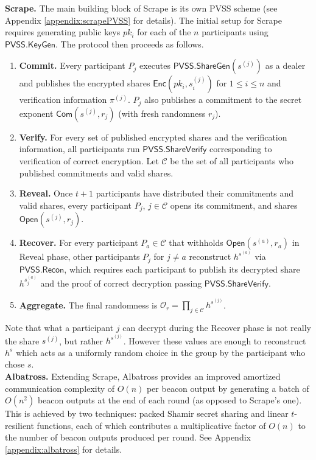 \documentclass[letterpaper,twocolumn,10pt]{article}
\theoremstyle{definition}
\theoremstyle{remark}
\begin{document}
\noindent\textbf{Scrape.} The main building block of Scrape is its own PVSS scheme (see Appendix \ref{appendix:scrapePVSS} for details). The initial setup for Scrape requires generating public keys $pk_i$ for each of the $n$ participants using $\mathsf{PVSS.KeyGen}$. The protocol then proceeds as follows.
\begin{enumerate}
\item \textbf{Commit.} Every participant $P_j$ executes $\mathsf{PVSS.ShareGen}(s^{(j)})$ as a dealer and publishes the encrypted shares $\mathsf{Enc}(pk_i, s^{(j)}_i)$ for $1 \le i \le n$ and verification information $\pi^{(j)}$. $P_j$ also publishes a commitment to the secret exponent $\mathsf{Com}(s^{(j)}, r_j)$ (with fresh randomness $r_j$).
\item \textbf{Verify.} For every set of published encrypted shares and the verification information, all participants run $\mathsf{PVSS.ShareVerify}$ corresponding to verification of correct encryption. Let $\mathcal{C}$ be the set of all participants who published commitments and valid shares.
\item \textbf{Reveal.} Once $t + 1$ participants have distributed their commitments and valid shares, every participant $P_j$, $j \in \mathcal{C}$ opens its commitment, and shares $\mathsf{Open}(s^{(j)}, r_j)$.
\item \textbf{Recover.} For every participant $P_a \in \mathcal{C}$ that withholds $\mathsf{Open}(s^{(a)}, r_a)$ in Reveal phase, other participants $P_j$ for $j \neq a$ reconstruct $h^{s^{(a)}}$ via $\mathsf{PVSS.Recon}$, which requires each participant to publish its decrypted share $h^{s_j^{(a)}}$ and the proof of correct decryption passing $\mathsf{PVSS.ShareVerify}$.
\item \textbf{Aggregate.} The final randomness is $\mathcal{O}_r = \prod_{j \in \mathcal{C}} h^{s^{(j)}}$.
\end{enumerate}

Note that what a participant $j$ can decrypt during the Recover phase is not really the share $s^{(j)}$, but rather $h^{s^{(j)}}$. However these values are enough to reconstruct $h^s$ which acts as a uniformly random choice in the group by the participant who chose $s$.\\

\noindent\textbf{Albatross.} Extending Scrape, Albatross \cite{cascudo2020albatross} provides an improved amortized communication complexity of $O(n)$ per beacon output by generating a batch of $O(n^2)$ beacon outputs at the end of each round (as opposed to Scrape's one). This is achieved by two techniques: packed Shamir secret sharing and linear $t$-resilient functions, each of which contributes a multiplicative factor of $O(n)$ to the number of beacon outputs produced per round. See Appendix \ref{appendix:albatross} for details.
\end{document}
